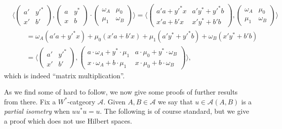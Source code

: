 \documentclass[a4paper,11pt]{article}
\theoremstyle{plain}
\theoremstyle{remark}
\newcommand{\mc}[1]{\mathcal{#1}}
\newcommand{\ip}[2]{{\langle {#1} , {#2} \rangle}}
\begin{document}
\begin{align*}
& \ip{ \begin{pmatrix} a' & y'^* \\ x' & b' \end{pmatrix} }{ \begin{pmatrix} a & y^* \\ x & b \end{pmatrix} \cdot \begin{pmatrix} \omega_A & \mu_0 \\ \mu_1 & \omega_B \end{pmatrix} }
= \ip{ \begin{pmatrix} a'a + y'^*x & a'y^* + y'^*b \\ x'a + b'x & x'y^* + b'b \end{pmatrix} }{ \begin{pmatrix} \omega_A & \mu_0 \\ \mu_1 & \omega_B \end{pmatrix} }  \\
&\qquad
= \omega_A(a'a + y'^*x) + \mu_0(x'a+b'x) + \mu_1(a'y^*+y'^*b) + \omega_B(x'y^*+b'b)   \\
&\qquad
= \ip{ \begin{pmatrix} a' & y'^* \\ x' & b' \end{pmatrix} }{ \begin{pmatrix} a\cdot\omega_A + y^*\cdot\mu_1 & a\cdot\mu_0 + y^*\cdot\omega_B \\ x\cdot\omega_A + b\cdot\mu_1 & x\cdot\mu_0 + b\cdot\omega_B \end{pmatrix} },
\end{align*}
which is indeed ``matrix multiplication''.

As we find some of \cite[Section~2]{GLR_Wstar_categories} hard to follow, we now give some proofs of further results from there.  Fix a $W^*$-catgeory $\mc A$.  Given $A,B\in\mc A$ we say that $u\in \mc A(A,B)$ is a \emph{partial isometry} when $u u^* u = u$.  The following is of course standard, but we give a proof which does not use Hilbert spaces.
\end{document}
